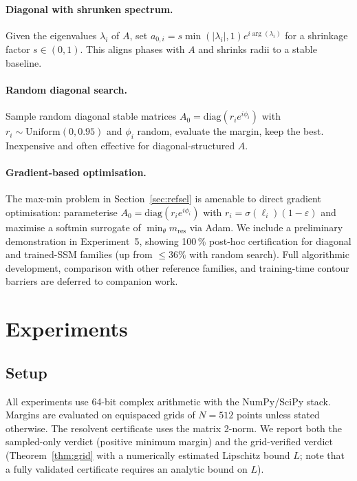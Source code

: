 \documentclass{article}
\theoremstyle{definition}
\begin{document}
\paragraph{Diagonal with shrunken spectrum.}
Given the eigenvalues $\lambda_i$ of $A$, set $a_{0,i} = s \min(|\lambda_i|, 1)
e^{i \arg(\lambda_i)}$ for a shrinkage factor $s \in (0, 1)$.  This
aligns phases with $A$ and shrinks radii to a stable baseline.

\paragraph{Random diagonal search.}
Sample random diagonal stable matrices $A_0 = \mathrm{diag}(r_i e^{i\phi_i})$
with $r_i \sim \mathrm{Uniform}(0, 0.95)$ and $\phi_i$ random, evaluate the
margin, keep the best.  Inexpensive and often effective for diagonal-structured $A$.

\paragraph{Gradient-based optimisation.}
The max-min problem in Section~\ref{sec:refsel} is amenable to direct
gradient optimisation: parameterise $A_0 = \mathrm{diag}(r_i e^{i\phi_i})$
with $r_i = \sigma(\ell_i)(1-\varepsilon)$ and maximise a softmin surrogate
of $\min_\theta m_{\mathrm{res}}$ via Adam.  We include a preliminary
demonstration in Experiment~5, showing 100\,\% post-hoc certification for
diagonal and trained-SSM families (up from $\leq 36\%$ with random search).
Full algorithmic development, comparison with other reference families, and
training-time contour barriers are deferred to companion work.

\section{Experiments}
\label{sec:experiments}

\subsection{Setup}

All experiments use 64-bit complex arithmetic with the NumPy/SciPy stack.
Margins are evaluated on equispaced grids of $N = 512$ points unless stated
otherwise.  The resolvent certificate uses the matrix 2-norm.  We report both
the sampled-only verdict (positive minimum margin) and the grid-verified
verdict (Theorem~\ref{thm:grid} with a numerically estimated Lipschitz bound
$L$; note that a fully validated certificate requires an analytic bound on $L$).
\end{document}
